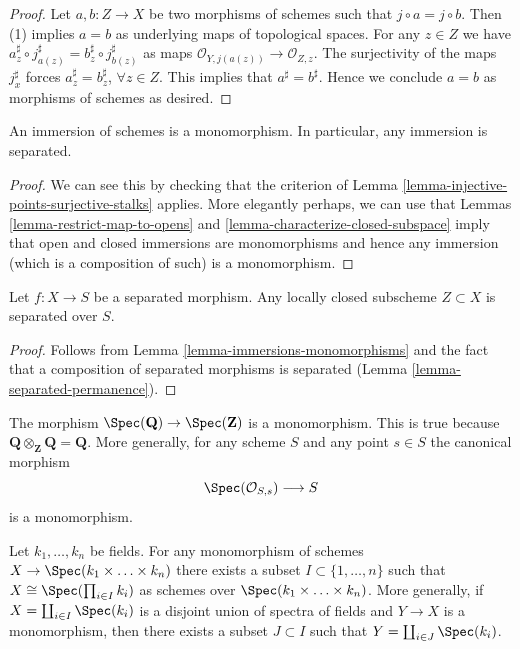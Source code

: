 \begin{proof}
Let $a, b : Z \to X$ be two morphisms of schemes such that
$j \circ a  = j \circ b$.
Then (1) implies $a = b$ as underlying
maps of topological spaces.
For any $z \in Z$ we have
$a^\sharp_z \circ j^\sharp_{a(z)} = b^\sharp_z \circ j^\sharp_{b(z)}$
as maps $\mathcal{O}_{Y, j(a(z))} \to \mathcal{O}_{Z, z}$.
The surjectivity of the maps
$j^\sharp_x$ forces $a^\sharp_z = b^\sharp_z$, $\forall z \in Z$.
This implies that $a^\sharp = b^\sharp$.
Hence we conclude $a = b$ as morphisms of schemes
as desired.
\end{proof}

\begin{lemma}
\label{lemma-immersions-monomorphisms}
An immersion of schemes is a monomorphism.
In particular, any immersion is separated.
\end{lemma}

\begin{proof}
We can see this by checking that the criterion of
Lemma \ref{lemma-injective-points-surjective-stalks} applies.
More elegantly perhaps, we can use that
Lemmas \ref{lemma-restrict-map-to-opens} and
\ref{lemma-characterize-closed-subspace} imply that
open and closed immersions are monomorphisms and hence
any immersion (which is a composition of such)
is a monomorphism.
\end{proof}

\begin{lemma}
\label{lemma-subscheme-of-separated-scheme}
Let $f : X \to S$ be a separated morphism.
Any locally closed subscheme $Z \subset X$ is separated over $S$.
\end{lemma}

\begin{proof}
Follows from Lemma \ref{lemma-immersions-monomorphisms}
and the fact that a composition of separated morphisms is separated
(Lemma \ref{lemma-separated-permanence}).
\end{proof}

\begin{example}
\label{example-Q-over-Z}
The morphism $\Spec(\mathbf{Q}) \to \Spec(\mathbf{Z})$
is a monomorphism. This is true because
$\mathbf{Q} \otimes_{\mathbf{Z}} \mathbf{Q} = \mathbf{Q}$.
More generally, for any scheme $S$ and any point $s \in S$ the
canonical morphism
$$
\Spec(\mathcal{O}_{S, s}) \longrightarrow S
$$
is a monomorphism.
\end{example}

\begin{lemma}
\label{lemma-mono-towards-spec-field}
Let $k_1, \ldots, k_n$ be fields.
For any monomorphism of schemes
$X \to \Spec(k_1 \times \ldots \times k_n)$
there exists a subset $I \subset \{1, \ldots, n\}$ such
that $X \cong \Spec(\prod_{i \in I} k_i)$ as
schemes over $\Spec(k_1 \times \ldots \times k_n)$.
More generally, if $X = \coprod_{i \in I} \Spec(k_i)$
is a disjoint union of spectra of fields and $Y \to X$ is a monomorphism,
then there exists a subset $J \subset I$ such that
$Y = \coprod_{i \in J} \Spec(k_i)$.
\end{lemma}

